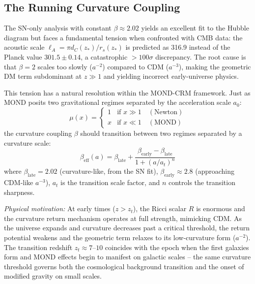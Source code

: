 \documentclass[aps,prd,twocolumn,superscriptaddress,nofootinbib,floatfix]{revtex4-2}
\begin{document}
\subsection{The Running Curvature Coupling}
\label{subsec:running_beta}

The SN-only analysis with constant $\beta \approx 2.02$ yields an excellent fit to the Hubble diagram but faces a fundamental tension when confronted with CMB data: the acoustic scale $\ell_A = \pi d_C(z_*)/r_s(z_*)$ is predicted as 316.9 instead of the Planck value $301.5 \pm 0.14$, a catastrophic $>100\sigma$ discrepancy. The root cause is that $\beta = 2$ scales too slowly ($a^{-2}$) compared to CDM ($a^{-3}$), making the geometric DM term subdominant at $z \gg 1$ and yielding incorrect early-universe physics.

This tension has a natural resolution within the MOND-CRM framework. Just as MOND posits two gravitational regimes separated by the acceleration scale $a_0$:
\begin{equation}
\mu(x) = \begin{cases} 1 & \text{if } x \gg 1 \quad (\text{Newton}) \\ x & \text{if } x \ll 1 \quad (\text{MOND}) \end{cases}
\end{equation}
the curvature coupling $\beta$ should transition between two regimes separated by a curvature scale:
\begin{equation}
\beta_{\mathrm{eff}}(a) = \beta_{\mathrm{late}} + \frac{\beta_{\mathrm{early}} - \beta_{\mathrm{late}}}{1 + (a/a_t)^n}
\label{eq:running_beta}
\end{equation}
where $\beta_{\mathrm{late}} = 2.02$ (curvature-like, from the SN fit), $\beta_{\mathrm{early}} \approx 2.8$ (approaching CDM-like $a^{-3}$), $a_t$ is the transition scale factor, and $n$ controls the transition sharpness.

\textit{Physical motivation:} At early times ($z > z_t$), the Ricci scalar $R$ is enormous and the curvature return mechanism operates at full strength, mimicking CDM. As the universe expands and curvature decreases past a critical threshold, the return potential weakens and the geometric term relaxes to its low-curvature form ($a^{-2}$). The transition redshift $z_t \approx 7\text{--}10$ coincides with the epoch when the first galaxies form and MOND effects begin to manifest on galactic scales -- the same curvature threshold governs both the cosmological background transition and the onset of modified gravity on small scales.
\end{document}
